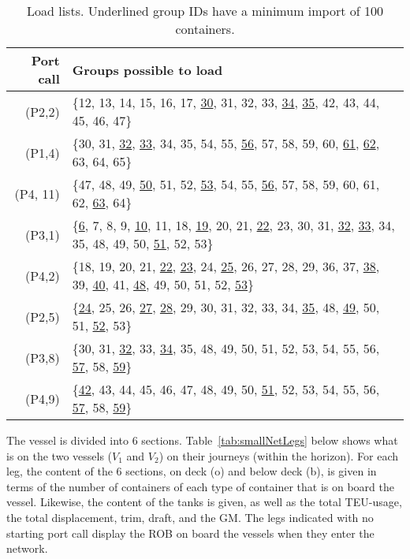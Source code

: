 \begin{table}[width=.9\linewidth,cols=2,pos=htbp]
\begin{scriptsize}
\begin{tabular*}{\tblwidth}{@{} RL @{}}
\toprule
Port call 			   & Groups possible to load\\
\midrule
	(P2,\phantom{ 1}2) & \{12, 13, 14, 15, 16, 17, \ul{30}, 31, 32, 33, \ul{34}, \ul{35}, 42, 43, 44, 45, 46, 47\}\\
	(P1,\phantom{ 1}4) & \{30, 31, \ul{32}, \ul{33}, 34, 35, 54, 55, \ul{56}, 57, 58, 59, 60, \ul{61}, \ul{62}, 63, 64, 65\}\\
	(P4,		   11) & \{47, 48, 49, \ul{50}, 51, 52, \ul{53}, 54, 55, \ul{56}, 57, 58, 59, 60, 61, 62, \ul{63}, 64\}\\
	(P3,\phantom{ 1}1) & \{\ul{6}, 7, 8, 9, \ul{10}, 11, 18, \ul{19}, 20, 21, \ul{22}, 23, 30, 31, \ul{32}, \ul{33}, 34, 35, 48, 49, 50, \ul{51}, 52, 53\}\\
	(P4,\phantom{ 1}2) & \{18, 19, 20, 21, \ul{22}, \ul{23}, 24, \ul{25}, 26, 27, 28, 29, 36, 37, \ul{38}, 39, \ul{40}, 41, \ul{48}, 49, 50, 51, 52, \ul{53}\}\\
	(P2,\phantom{ 1}5) & \{\ul{24}, 25, 26, \ul{27}, \ul{28}, 29, 30, 31, 32, 33, 34, \ul{35}, 48, \ul{49}, 50, 51, \ul{52}, 53\}\\
	(P3,\phantom{ 1}8) & \{30, 31, \ul{32}, 33, \ul{34}, 35, 48, 49, 50, 51, 52, 53, 54, 55, 56, \ul{57}, 58, \ul{59}\}\\
	(P4,\phantom{ 1}9) & \{\ul{42}, 43, 44, 45, 46, 47, 48, 49, 50, \ul{51}, 52, 53, 54, 55, 56, \ul{57}, 58, \ul{59}\}\\
\bottomrule
\end{tabular*}
\caption{Load lists. Underlined group IDs have a minimum import of 100 containers.}\label{tab:loadLists}
\end{scriptsize}
\end{table}

The vessel is divided into 6 sections. 
Table~\ref{tab:smallNetLegs} below shows what is on the two vessels ($V_1$ and $V_2$) on their journeys (within the horizon). For each leg, the content of the 6 sections, on deck (o) and below deck (b), is given in terms of the number of containers of each type of container that is on board the vessel. Likewise, the content of the tanks is given, as well as the total TEU-usage, the total displacement, trim, draft, and the GM. The legs indicated with no starting port call display the ROB on board the vessels when they enter the network.

